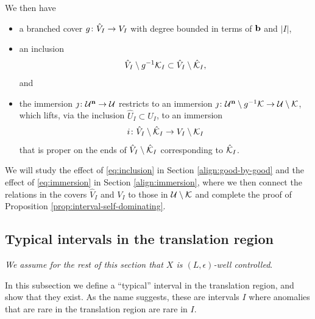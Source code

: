 We then have 
\begin{itemize}
\item
a branched cover $g\colon \hat V_I \to V_I$ with degree bounded in terms of $\mathbf b$ and $|I|$,
\item
an inclusion
\begin{equation} \label{eq:inclusion}
\hat V_I \setminus g^{-1}\mathcal K_I \subset \hat V_I \setminus \hat {\mathcal K}_I,
\end{equation}
and 
\item
the immersion $\jmath\colon \mathcal U^{\mathbf{n}} \to \mathcal U$ 
restricts to an immersion $\jmath\colon \mathcal U^{\mathbf{n}} \setminus g^{-1}\mathcal K \to \mathcal U\setminus \mathcal K$, 
which lifts, 
via the inclusion $ \hat U_I \subset U_I$,
to an immersion 
\begin{equation} \label{eq:immersion}
i \colon \hat V_I \setminus \hat {\mathcal K}_I \to V_I \setminus \mathcal K_I
\end{equation}
that is proper on the ends of $\hat V_I \setminus \hat {\mathcal K}_I$ corresponding to  $\hat{\mathcal K}_I$. 
\end{itemize}
We will study the effect of \eqref{eq:inclusion} in Section \ref{align:good-by-good} and the effect of \eqref{eq:immersion} in Section \ref{align:immersion}, where
we then connect the relations in the covers $\hat V_I$ and $V_I$ to those in $\mathcal U \setminus \mathcal K$ and complete the proof of Proposition \ref{prop:interval-self-dominating}.


\subsection{Typical intervals in the translation region} \label{align:typical}
\emph{We assume for the rest of this section that $X$ is $(L, \epsilon)$-well controlled}.

In this subsection we define a ``typical'' interval in the translation region, and show that they exist. As the name suggests, these are intervals $I$ where anomalies that are rare in the translation region are rare in $I$.

